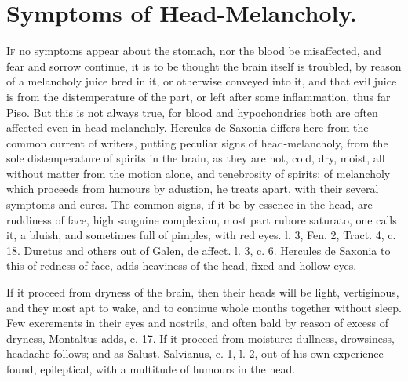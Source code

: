 {%
\section{Symptoms of Head-Melancholy.}

\lettrine{I}{f} no symptoms appear about the stomach, nor the blood be
misaffected, and fear and sorrow continue, it is to be thought the
brain itself is troubled, by reason of a melancholy juice bred in it,
or otherwise conveyed into it, and that evil juice is from the
distemperature of the part, or left after some inflammation, thus far
Piso. But this is not always true, for blood and hypochondries both are
often affected even in head-melancholy. Hercules de Saxonia
differs here from the common current of writers, putting peculiar signs
of head-melancholy, from the sole distemperature of spirits in the
brain, as they are hot, cold, dry, moist, all without matter from the
motion alone, and tenebrosity of spirits; of melancholy which proceeds
from humours by adustion, he treats apart, with their several symptoms
and cures. The common signs, if it be by essence in the head, are
ruddiness of face, high sanguine complexion, most part rubore saturato,
one calls it, a bluish, and sometimes full of pimples, with red
eyes. \Avicenna{} l. 3, Fen. 2, Tract. 4, c. 18. Duretus and others out of
Galen, de affect. l. 3, c. 6. Hercules de Saxonia to this of
redness of face, adds heaviness of the head, fixed and hollow eyes.

If it proceed from dryness of the brain, then their heads will be
light, vertiginous, and they most apt to wake, and to continue whole
months together without sleep. Few excrements in their eyes and
nostrils, and often bald by reason of excess of dryness, Montaltus
adds, c. 17. If it proceed from moisture: dullness, drowsiness,
headache follows; and as Salust. Salvianus, c. 1, l. 2, out of his own
experience found, epileptical, with a multitude of humours in the head.

}
